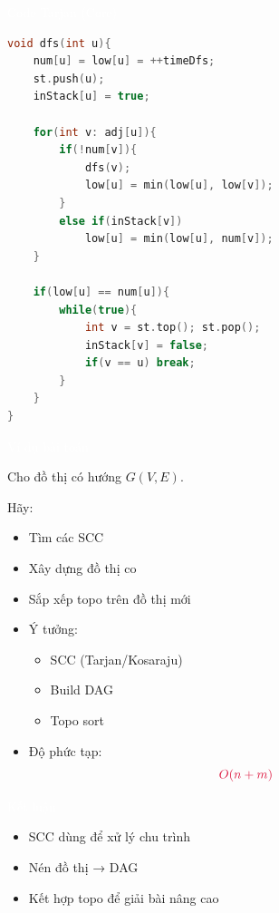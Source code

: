 \documentclass{beamer}
\newcommand{\hlblue}[1]{\textcolor{myblue}{#1}}
\newcommand{\hlgreen}[1]{\textcolor{mygreen}{#1}}
\newcommand{\hlred}[1]{\textcolor{myred}{#1}}
\newcommand{\hlpurple}[1]{\textcolor{mypurple}{#1}}
\newcommand{\hlwhite}[1]{\textcolor{white}{#1}}
\begin{document}
\begin{frame}[fragile]{\hlwhite{Code Tarjan (Core)}}
\begin{lstlisting}[language=C++]
void dfs(int u){
    num[u] = low[u] = ++timeDfs;
    st.push(u);
    inStack[u] = true;

    for(int v: adj[u]){
        if(!num[v]){
            dfs(v);
            low[u] = min(low[u], low[v]);
        }
        else if(inStack[v])
            low[u] = min(low[u], num[v]);
    }

    if(low[u] == num[u]){
        while(true){
            int v = st.top(); st.pop();
            inStack[v] = false;
            if(v == u) break;
        }
    }
}
\end{lstlisting}
\end{frame}


\begin{frame}{\hlwhite{Ví dụ bài toán}}
\begin{tcolorbox}[title=\textbf{\hlwhite{Đề bài}}]
Cho đồ thị có hướng $G(V, E)$.

Hãy:
\begin{itemize}
\item Tìm các SCC
\item Xây dựng đồ thị co
\item Sắp xếp topo trên đồ thị mới
\end{itemize}
\end{tcolorbox}

\begin{itemize}
\item Ý tưởng:
\begin{itemize}
\item \hlblue{SCC (Tarjan/Kosaraju)}
\item \hlgreen{Build DAG}
\item \hlpurple{Topo sort}
\end{itemize}

\item Độ phức tạp:
\[
\hlred{O(n + m)}
\]
\end{itemize}
\end{frame}


\begin{frame}{\hlwhite{Kết luận}}
\begin{itemize}
\item SCC dùng để xử lý chu trình
\item Nén đồ thị → DAG
\item Kết hợp topo để giải bài nâng cao
\end{itemize}
\end{frame}
\end{document}
